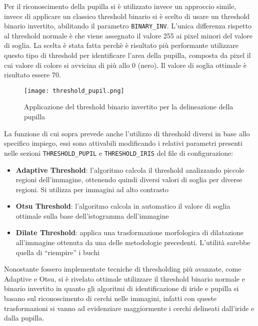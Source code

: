 Per il riconoscimento della pupilla si è utilizzato invece  un approccio simile, invece di applicare un classico threshold binario si è scelto di usare un threshold binario invertito, abilitando il parametro \texttt{BINARY\_INV}. L’unica differenza rispetto al threshold normale è che viene assegnato il valore 255 ai pixel minori del valore di soglia. La scelta è stata fatta perchè è risultato più performante utilizzare questo tipo di threshold per identificare l’area della pupilla, composta da pixel il cui valore di colore si avvicina di più allo 0 (nero). Il valore di soglia ottimale è risultato essere 70.

\begin{figure}[h]
  \centering
  \texttt{[image: threshold\_pupil.png]}
  \caption{Applicazione del threshold binario invertito per la delineazione della pupilla}
\end{figure}

La funzione di cui sopra prevede anche l’utilizzo di threshold diversi in base allo specifico impiego, essi sono attivabili modificando i relativi parametri presenti nelle sezioni \texttt{THRESHOLD\_PUPIL} e \texttt{THRESHOLD\_IRIS} del file di configurazione:

\begin{itemize}
  \item \textbf{Adaptive Threshold}: l’algoritmo calcola il threshold analizzando piccole regioni dell’immagine, ottenendo quindi diversi valori di soglia per diverse regioni. Si utilizza per immagini ad alto contrasto
  \item \textbf{Otsu Threshold}: l’algoritmo calcola in automatico il valore di soglia ottimale sulla base dell’istogramma dell'immagine
  \item \textbf{Dilate Threshold}: applica una trasformazione morfologica di dilatazione all’immagine ottenuta da una delle metodologie precedenti. L’utilità sarebbe quella di “riempire” i buchi
\end{itemize}

Nonostante fossero implementate tecniche di thresholding più avanzate, come Adaptive e Otsu, si è rivelato ottimale utilizzare il threshold binario normale e binario invertito in quanto gli algoritmi di identificazione di iride e pupilla si basano sul riconoscimento di cerchi nelle immagini, infatti con queste trasformazioni si vanno ad evidenziare maggiormente i cerchi delineati dall’iride e dalla pupilla.
